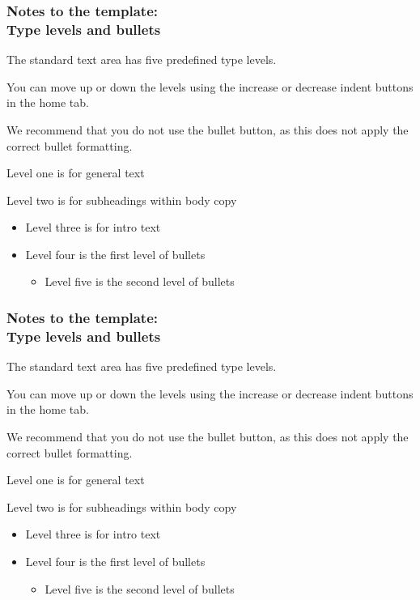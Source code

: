 \documentclass[11pt,aspectratio=169,t]{beamer}
\begin{document}
\begin{frame}
  \frametitle{Notes to the template:\\Type levels and bullets}

  The standard text area has five predefined type levels.
    
  You can move up or down the levels using the increase or decrease indent buttons in the home tab.
  
  We recommend that you do not use the bullet button, as this does not apply the correct bullet formatting.
  
  Level one is for general text
  
  Level two is for subheadings within body copy
  
\begin{itemize}
\item Level three is for intro text
\item Level four is the first level of bullets
  \begin{itemize}
  \item Level five is the second level of bullets
  \end{itemize}
\end{itemize}
\end{frame}

\begin{frame}
  \frametitle{Notes to the template:\\Type levels and bullets}

  The standard text area has five predefined type levels.
    
  You can move up or down the levels using the increase or decrease indent buttons in the home tab.
  
  We recommend that you do not use the bullet button, as this does not apply the correct bullet formatting.
  
  Level one is for general text
  
  Level two is for subheadings within body copy
  
\begin{itemize}
\item Level three is for intro text
\item Level four is the first level of bullets
  \begin{itemize}
  \item Level five is the second level of bullets
  \end{itemize}
\end{itemize}
\end{frame}
\end{document}
